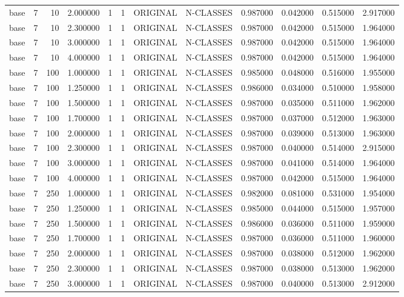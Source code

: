 \begin{tabular}{lrrrllllrrrr}
base & 7 & 10 & 2.000000 & 1 & 1 & ORIGINAL & N-CLASSES & 0.987000 & 0.042000 & 0.515000 & 2.917000 \\
base & 7 & 10 & 2.300000 & 1 & 1 & ORIGINAL & N-CLASSES & 0.987000 & 0.042000 & 0.515000 & 1.964000 \\
base & 7 & 10 & 3.000000 & 1 & 1 & ORIGINAL & N-CLASSES & 0.987000 & 0.042000 & 0.515000 & 1.964000 \\
base & 7 & 10 & 4.000000 & 1 & 1 & ORIGINAL & N-CLASSES & 0.987000 & 0.042000 & 0.515000 & 1.964000 \\
base & 7 & 100 & 1.000000 & 1 & 1 & ORIGINAL & N-CLASSES & 0.985000 & 0.048000 & 0.516000 & 1.955000 \\
base & 7 & 100 & 1.250000 & 1 & 1 & ORIGINAL & N-CLASSES & 0.986000 & 0.034000 & 0.510000 & 1.958000 \\
base & 7 & 100 & 1.500000 & 1 & 1 & ORIGINAL & N-CLASSES & 0.987000 & 0.035000 & 0.511000 & 1.962000 \\
base & 7 & 100 & 1.700000 & 1 & 1 & ORIGINAL & N-CLASSES & 0.987000 & 0.037000 & 0.512000 & 1.963000 \\
base & 7 & 100 & 2.000000 & 1 & 1 & ORIGINAL & N-CLASSES & 0.987000 & 0.039000 & 0.513000 & 1.963000 \\
base & 7 & 100 & 2.300000 & 1 & 1 & ORIGINAL & N-CLASSES & 0.987000 & 0.040000 & 0.514000 & 2.915000 \\
base & 7 & 100 & 3.000000 & 1 & 1 & ORIGINAL & N-CLASSES & 0.987000 & 0.041000 & 0.514000 & 1.964000 \\
base & 7 & 100 & 4.000000 & 1 & 1 & ORIGINAL & N-CLASSES & 0.987000 & 0.042000 & 0.515000 & 1.964000 \\
base & 7 & 250 & 1.000000 & 1 & 1 & ORIGINAL & N-CLASSES & 0.982000 & 0.081000 & 0.531000 & 1.954000 \\
base & 7 & 250 & 1.250000 & 1 & 1 & ORIGINAL & N-CLASSES & 0.985000 & 0.044000 & 0.515000 & 1.957000 \\
base & 7 & 250 & 1.500000 & 1 & 1 & ORIGINAL & N-CLASSES & 0.986000 & 0.036000 & 0.511000 & 1.959000 \\
base & 7 & 250 & 1.700000 & 1 & 1 & ORIGINAL & N-CLASSES & 0.987000 & 0.036000 & 0.511000 & 1.960000 \\
base & 7 & 250 & 2.000000 & 1 & 1 & ORIGINAL & N-CLASSES & 0.987000 & 0.038000 & 0.512000 & 1.962000 \\
base & 7 & 250 & 2.300000 & 1 & 1 & ORIGINAL & N-CLASSES & 0.987000 & 0.038000 & 0.513000 & 1.962000 \\
base & 7 & 250 & 3.000000 & 1 & 1 & ORIGINAL & N-CLASSES & 0.987000 & 0.040000 & 0.513000 & 2.912000 \\

\end{tabular}
